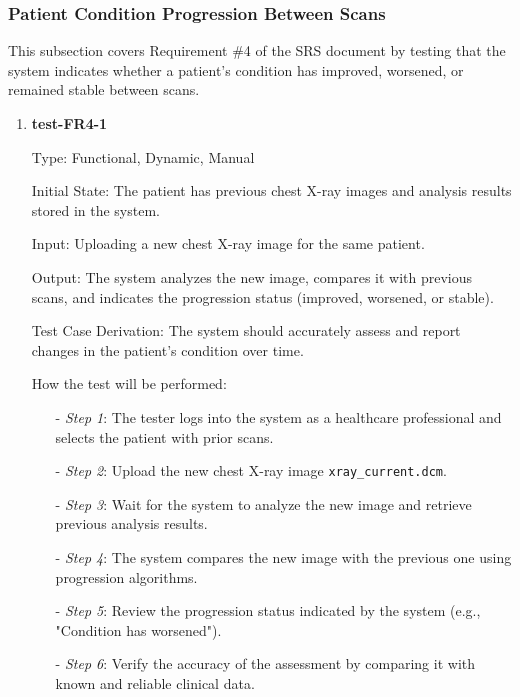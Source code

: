 \documentclass[12pt, titlepage]{article}
\begin{document}
\subsubsection{Patient Condition Progression Between Scans}

This subsection covers Requirement \#4 of the SRS document by testing that the system indicates whether a patient's condition has improved, worsened, or remained stable between scans.

\begin{enumerate}

\item \textbf{test-FR4-1} \label{test-FR4-1}

Type: Functional, Dynamic, Manual

Initial State: The patient has previous chest X-ray images and analysis results stored in the system.

Input: Uploading a new chest X-ray image for the same patient.

Output: The system analyzes the new image, compares it with previous scans, and indicates the progression status (improved, worsened, or stable).

Test Case Derivation: The system should accurately assess and report changes in the patient's condition over time.

How the test will be performed:

\begin{itemize}
  \item[-] \textit{Step 1}: The tester logs into the system as a healthcare professional and selects the patient with prior scans.
  \item[-] \textit{Step 2}: Upload the new chest X-ray image \texttt{xray\_current.dcm}.
  \item[-] \textit{Step 3}: Wait for the system to analyze the new image and retrieve previous analysis results.
  \item[-] \textit{Step 4}: The system compares the new image with the previous one using progression algorithms.
  \item[-] \textit{Step 5}: Review the progression status indicated by the system (e.g., "Condition has worsened").
  \item[-] \textit{Step 6}: Verify the accuracy of the assessment by comparing it with known and reliable clinical data.
\end{itemize}

\end{enumerate}
\end{document}
